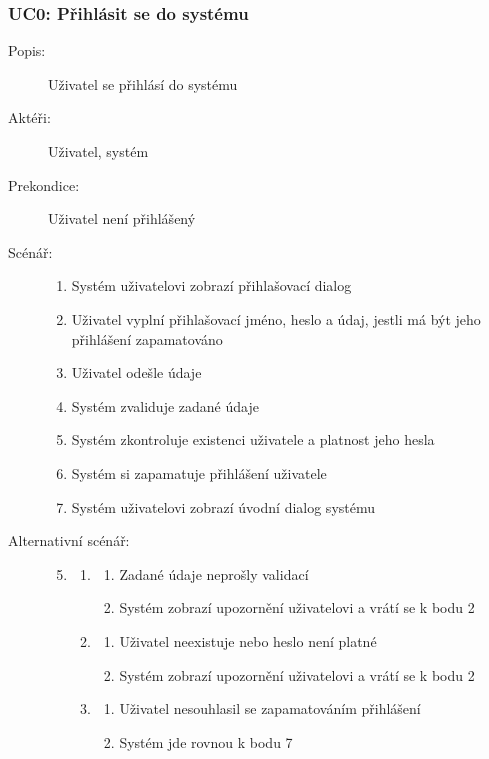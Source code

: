 \documentclass[a4paper,10pt,titlepage]{article}
\begin{document}
	\subsubsection*{UC0: Přihlásit se do systému}
	\begin{description}
		\item[Popis:] Uživatel se přihlásí do systému
		\item[Aktéři:] Uživatel, systém
		\item[Prekondice:] Uživatel není přihlášený
		\item[Scénář:] \hfill
				\begin{enumerate}
					\item Systém uživatelovi zobrazí přihlašovací dialog
					\item Uživatel vyplní přihlašovací jméno, heslo a údaj, jestli má být jeho přihlášení zapamatováno
					\item Uživatel odešle údaje
					\item Systém zvaliduje zadané údaje
					\item Systém zkontroluje existenci uživatele a platnost jeho hesla
					\item Systém si zapamatuje přihlášení uživatele
					\item Systém uživatelovi zobrazí úvodní dialog systému
				\end{enumerate}
		\item[Alternativní scénář:] \hfill
				\begin{enumerate}
					\setcounter{enumi}{4}
					\setcounter{enumii}{0}
					\item \begin{enumerate}[label*=\arabic*.,leftmargin=8pt]
						\item
						\begin{enumerate}[label=\alph*.]
							\item Zadané údaje neprošly validací
							\item Systém zobrazí upozornění uživatelovi a vrátí se k bodu 2
						\end{enumerate}
						\setcounter{enumi}{5}
						\setcounter{enumii}{0}
						\item
						\begin{enumerate}[label=\alph*.]
							\item Uživatel neexistuje nebo heslo není platné
							\item Systém zobrazí upozornění uživatelovi a vrátí se k bodu 2
						\end{enumerate}
						\setcounter{enumi}{6}
						\setcounter{enumii}{0}
						\item
						\begin{enumerate}[label=\alph*.]
							\item Uživatel nesouhlasil se zapamatováním přihlášení
							\item Systém jde rovnou k bodu 7
						\end{enumerate}
					\end{enumerate}		
				\end{enumerate}
	\end{description}
\end{document}
